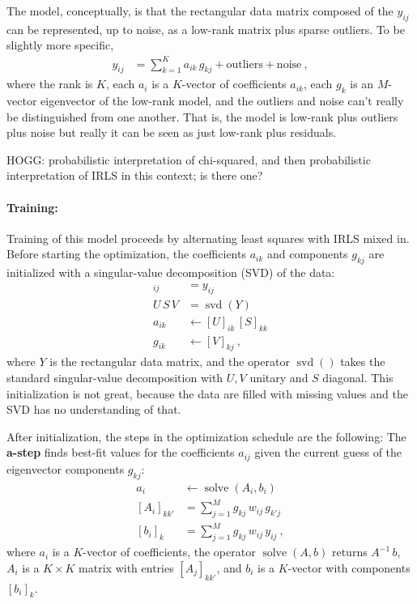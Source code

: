 \documentclass{article}
\DeclareMathOperator{\solve}{solve}
\DeclareMathOperator{\svd}{svd}
\begin{document}
The model, conceptually, is that the rectangular data matrix composed of the $y_{ij}$ can be represented, up to noise, as a low-rank matrix plus sparse outliers.
To be slightly more specific,
\begin{align}
    y_{ij} &= \sum_{k=1}^K a_{ik}\,g_{kj} + \text{outliers} + \text{noise} \label{eq:model}~,
\end{align}
where the rank is $K$,
each $a_i$ is a $K$-vector of coefficients $a_{ik}$,
each $g_k$ is an $M$-vector eigenvector of the low-rank model,
and the outliers and noise can't really be distinguished from one another.
That is, the model is low-rank plus outliers plus noise but really it can be seen as just low-rank plus residuals.

HOGG: probabilistic interpretation of chi-squared, and then probabilistic interpretation of IRLS in this context; is there one?

\paragraph{Training:}
Training of this model proceeds by alternating least squares with IRLS mixed in.
Before starting the optimization, the coefficients $a_{ik}$ and components $g_{kj}$ are initialized with a singular-value decomposition (SVD) of the data:
\begin{align}
    [Y]_{ij} &= y_{ij} \\
    U\,S\,V &= \svd(Y) \\
    a_{ik} &\leftarrow [U]_{ik}\,[S]_{kk} \\
    g_{ik} &\leftarrow [V]_{kj} ~,
\end{align}
where $Y$ is the rectangular data matrix,
and the operator $\svd()$ takes the standard singular-value decomposition with $U, V$ unitary and $S$ diagonal.
This initialization is not great, because the data are filled with missing values and the SVD has no understanding of that.

After initialization, the steps in the optimization schedule are the following:
The \textbf{a-step} finds best-fit values for the coefficients $a_{ij}$ given the current guess of the eigenvector components $g_{kj}$:
\begin{align}
    a_i &\leftarrow \solve(A_i, b_i) \label{eq:a-step} \\
    [A_i]_{kk'} &= \sum_{j=1}^M g_{kj}\,w_{ij}\,g_{k'j} \\
    [b_i]_k     &= \sum_{j=1}^M g_{kj}\,w_{ij}\,y_{ij} ~,
\end{align}
where $a_i$ is a $K$-vector of coefficients,
the operator $\solve(A, b)$ returns $A^{-1}\,b$,
$A_i$ is a $K\times K$ matrix with entries $[A_j]_{kk'}$,
and $b_i$ is a $K$-vector with components $[b_i]_k$.
\end{document}
